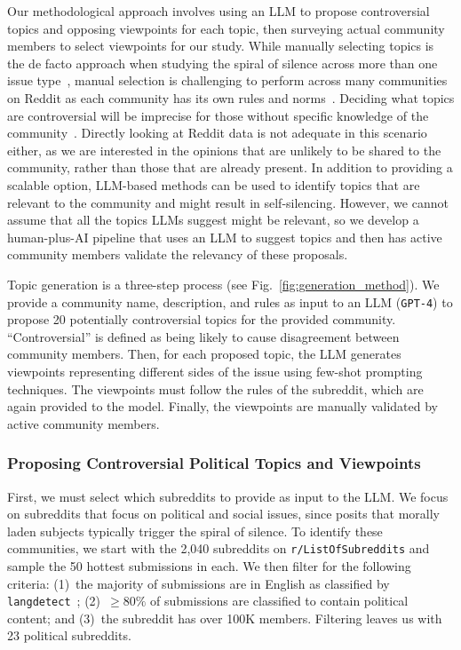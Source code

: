 Our methodological approach involves using an LLM to propose controversial topics and opposing viewpoints for each topic, then surveying actual community members to select viewpoints for our study. While manually selecting topics is the de facto approach when studying the spiral of silence across more than one issue type~\cite{gearhart2018same,lee2004cross}, manual selection is challenging to perform across many communities on Reddit as each community has its own rules and norms~\cite{fiesler2018reddit}. Deciding what topics are controversial will be imprecise for those without specific knowledge of the community~\cite{hessel2019something,chen2013and}. Directly looking at Reddit data is not adequate in this scenario either, as we are interested in the opinions that are unlikely to be shared to the community, rather than those that are already present. In addition to providing a scalable option, LLM-based methods can be used to identify topics that are relevant to the community and might result in self-silencing. However, we cannot assume that all the topics LLMs suggest might be relevant, so we develop a human-plus-AI pipeline that uses an LLM to suggest topics and then has active community members validate the relevancy of these proposals.

Topic generation is a three-step process (see Fig.~\ref{fig:generation_method}). We provide a community name, description, and rules as input to an LLM (\texttt{GPT-4}) to propose 20 potentially controversial topics for the provided community. ``Controversial'' is defined as being likely to cause disagreement between community members. Then, for each proposed topic, the LLM generates viewpoints representing different sides of the issue using few-shot prompting techniques. The viewpoints must follow the rules of the subreddit, which are again provided to the model. Finally, the viewpoints are manually validated by active community members. 

\subsubsection{Proposing Controversial Political Topics and Viewpoints}
\label{subsec:sublist}
First, we must select which subreddits to provide as input to the LLM. We focus on subreddits that focus on political and social issues, since \citet{noelle1974spiral} posits that morally laden subjects typically trigger the spiral of silence. To identify these communities, we start with the 2,040 subreddits on \texttt{r/ListOfSubreddits} and sample the 50 hottest submissions in each. We then filter for the following criteria: (1)~the majority of submissions are in English as classified by \texttt{langdetect}~\cite{nakatani2010langdetect}; (2)~$\geq80\%$ of submissions are classified to contain political content; and (3)~the subreddit has over 100K members. Filtering leaves us with 23 political subreddits.

